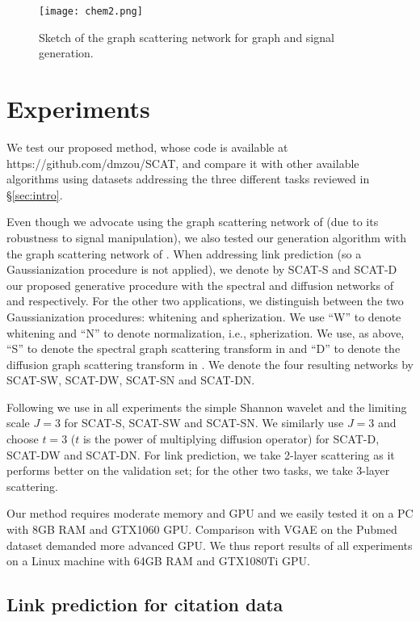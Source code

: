 \documentclass[conference]{IEEEtran}
\begin{document}
\begin{figure}[t]
    \centering
    \texttt{[image: chem2.png]}
    \caption{Sketch of the graph scattering network for graph and signal generation.} 
    \label{fig:chem}
\end{figure}


\section{Experiments}\label{sec:experiments} 
We test our proposed method, whose code is available at https://github.com/dmzou/SCAT, and compare it with other available algorithms using datasets addressing the three different tasks reviewed in \S\ref{sec:intro}.

Even though we advocate using the graph scattering network of \cite{zou2018graph} (due to its robustness to signal manipulation), we also tested our generation algorithm with the graph scattering network of \cite{gama2018diffusion}. When addressing link prediction (so a Gaussianization procedure is not applied), we denote by SCAT-S and SCAT-D our proposed generative procedure with the spectral and diffusion networks of \cite{zou2018graph} and \cite{gama2018diffusion} respectively. For the other two applications, we distinguish between the two Gaussianization procedures: whitening and spherization. 
We use ``W'' to denote whitening and ``N'' to denote normalization, i.e., spherization. We use, as above, ``S'' to denote the spectral graph scattering transform in \cite{zou2018graph} and ``D'' to denote the diffusion graph scattering transform in \cite{gama2018diffusion}. We denote the four resulting networks by SCAT-SW, SCAT-DW, SCAT-SN and SCAT-DN. 

Following \cite{zou2018graph} we use in all experiments the simple Shannon wavelet and {the limiting scale} $J = 3$ for SCAT-S, SCAT-SW and SCAT-SN. We similarly use $J = 3$ and choose $t=3$ ($t$ is the power of multiplying diffusion operator) for SCAT-D, SCAT-DW and SCAT-DN. For link prediction, we take 2-layer scattering as it performs better on the validation set; for the other two tasks, we take 3-layer scattering.


Our method requires moderate memory and GPU and we easily tested it on a PC with 8GB RAM and GTX1060 GPU. Comparison with VGAE on the Pubmed dataset demanded more advanced GPU. We thus report results of all experiments on a Linux machine with 64GB RAM and GTX1080Ti GPU.


\subsection{Link prediction for citation data}\label{subsec:linkpred}
\end{document}

